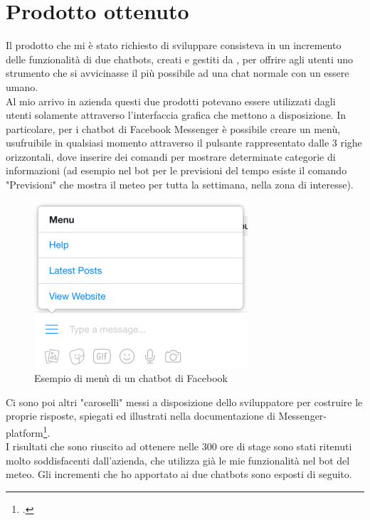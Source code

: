 \section{Prodotto ottenuto}
Il prodotto che mi è stato richiesto di sviluppare consisteva in un incremento delle funzionalità di due \glspl{chatbot}, creati e gestiti da \azienda{}, per offrire agli utenti uno strumento che si avvicinasse il più possibile ad una chat normale con un essere umano.\\
Al mio arrivo in azienda questi due prodotti potevano essere utilizzati dagli utenti solamente attraverso l'interfaccia grafica che mettono a disposizione. In particolare, per i \gls{chatbot} di Facebook Messenger è possibile creare un menù, usufruibile in qualsiasi momento attraverso il pulsante rappresentato dalle 3 righe orizzontali, dove inserire dei comandi per mostrare determinate categorie di informazioni (ad esempio nel bot per le previsioni del tempo esiste il comando "Previsioni" che mostra il meteo per tutta la settimana, nella zona di interesse). 
\begin{figure}[!h]
	\centering
	\includegraphics[scale=0.6]{../Immagini/menu.png}
	\caption{Esempio di menù di un \gls{chatbot} di Facebook}
\end{figure}

Ci sono poi altri "caroselli" messi a disposizione dello sviluppatore per costruire le proprie risposte, spiegati ed illustrati nella documentazione di Messenger-platform\footcite{messenger}.\\

I risultati che sono riuscito ad ottenere nelle 300 ore di stage sono stati ritenuti molto soddisfacenti dall'azienda, che utilizza già le mie funzionalità nel bot del meteo. Gli incrementi che ho apportato ai due \glspl{chatbot} sono esposti di seguito. 

